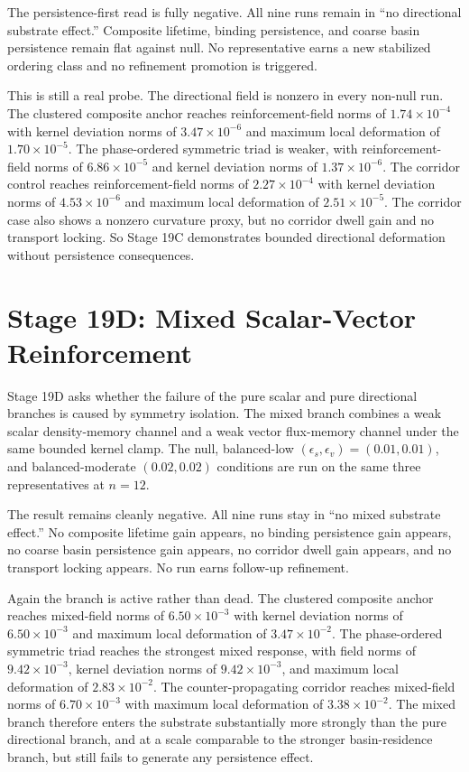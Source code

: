 \documentclass[11pt]{article}
\begin{document}
The persistence-first read is fully negative. All nine runs remain in ``no directional substrate effect.'' Composite lifetime, binding persistence, and coarse basin persistence remain flat against null. No representative earns a new stabilized ordering class and no refinement promotion is triggered.

This is still a real probe. The directional field is nonzero in every non-null run. The clustered composite anchor reaches reinforcement-field norms of $1.74\times10^{-4}$ with kernel deviation norms of $3.47\times10^{-6}$ and maximum local deformation of $1.70\times10^{-5}$. The phase-ordered symmetric triad is weaker, with reinforcement-field norms of $6.86\times10^{-5}$ and kernel deviation norms of $1.37\times10^{-6}$. The corridor control reaches reinforcement-field norms of $2.27\times10^{-4}$ with kernel deviation norms of $4.53\times10^{-6}$ and maximum local deformation of $2.51\times10^{-5}$. The corridor case also shows a nonzero curvature proxy, but no corridor dwell gain and no transport locking. So Stage 19C demonstrates bounded directional deformation without persistence consequences.

\section{Stage 19D: Mixed Scalar-Vector Reinforcement}

Stage 19D asks whether the failure of the pure scalar and pure directional branches is caused by symmetry isolation. The mixed branch combines a weak scalar density-memory channel and a weak vector flux-memory channel under the same bounded kernel clamp. The null, balanced-low $(\epsilon_s,\epsilon_v)=(0.01,0.01)$, and balanced-moderate $(0.02,0.02)$ conditions are run on the same three representatives at $n=12$.

The result remains cleanly negative. All nine runs stay in ``no mixed substrate effect.'' No composite lifetime gain appears, no binding persistence gain appears, no coarse basin persistence gain appears, no corridor dwell gain appears, and no transport locking appears. No run earns follow-up refinement.

Again the branch is active rather than dead. The clustered composite anchor reaches mixed-field norms of $6.50\times10^{-3}$ with kernel deviation norms of $6.50\times10^{-3}$ and maximum local deformation of $3.47\times10^{-2}$. The phase-ordered symmetric triad reaches the strongest mixed response, with field norms of $9.42\times10^{-3}$, kernel deviation norms of $9.42\times10^{-3}$, and maximum local deformation of $2.83\times10^{-2}$. The counter-propagating corridor reaches mixed-field norms of $6.70\times10^{-3}$ with maximum local deformation of $3.38\times10^{-2}$. The mixed branch therefore enters the substrate substantially more strongly than the pure directional branch, and at a scale comparable to the stronger basin-residence branch, but still fails to generate any persistence effect.
\end{document}
